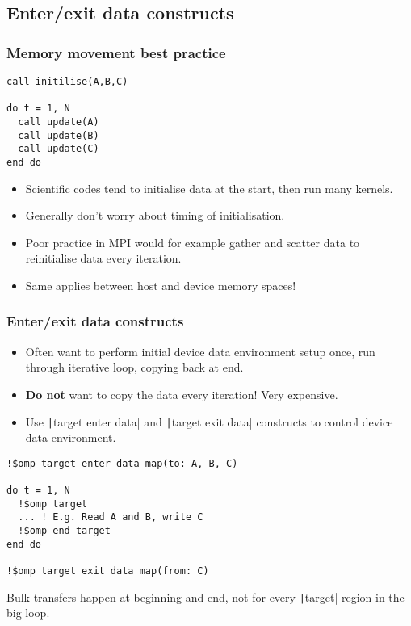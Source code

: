 \documentclass{beamer}
\begin{document}
\subsection{Enter/exit data constructs}
\begin{frame}[fragile]
\frametitle{Memory movement best practice}

\begin{verbatim}
call initilise(A,B,C)

do t = 1, N
  call update(A)
  call update(B)
  call update(C)
end do
\end{verbatim}

\begin{itemize}
  \item Scientific codes tend to initialise data at the start, then run many kernels.
  \item Generally don't worry about timing of initialisation.
  \item Poor practice in MPI would for example gather and scatter data to reinitialise data every iteration.
  \item Same applies between host and device memory spaces!
\end{itemize}

\end{frame}

\begin{frame}[fragile]
\frametitle{Enter/exit data constructs}
\begin{itemize}
  \item Often want to perform initial device data environment setup once, run through iterative loop, copying back at end.
  \item \textbf{Do not} want to copy the data every iteration! Very expensive.
  \item Use \texttt|target enter data| and \texttt|target exit data| constructs to control device data environment.
\end{itemize}

\begin{verbatim}
!$omp target enter data map(to: A, B, C)

do t = 1, N
  !$omp target
  ... ! E.g. Read A and B, write C
  !$omp end target
end do

!$omp target exit data map(from: C)

\end{verbatim}
Bulk transfers happen at beginning and end, not for every \texttt|target| region in the big loop.
\end{frame}
\end{document}
